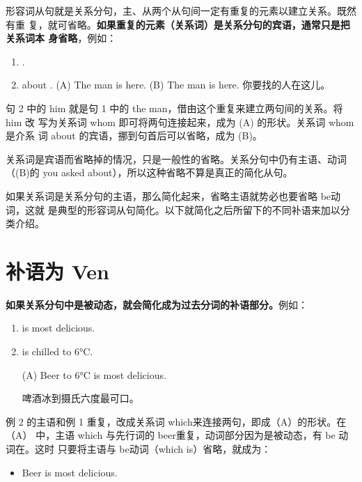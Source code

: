 形容词从句就是关系分句，主、从两个从句间一定有重复的元素以建立关系。既然有重
复，就可省略。\textbf{如果重复的元素（关系词）是关系分句的宾语，通常只是把关系词本
  身省略}，例如：

\begin{enumerate}
\item {}  .
\item {}  about .
\reitem (A) The man  is here.
\reitem (B) The man  is here.
你要找的人在这儿。
\end{enumerate}
句 2 中的 him 就是句 1 中的 the man，借由这个重复来建立两句间的关系。将him 改
写为关系词 whom 即可将两句连接起来，成为 (A) 的形状。关系词 whom是介系
词 about 的宾语，挪到句首后可以省略，成为 (B)。

关系词是宾语而省略掉的情况，只是一般性的省略。关系分句中仍有主语、动词
（(B)的 you asked about），所以这种省略不算是真正的简化从句。

如果关系词是关系分句的主语，那么简化起来，省略主语就势必也要省略 be动词，这就
是典型的形容词从句简化。以下就简化之后所留下的不同补语来加以分类介绍。

\section{补语为 Ven}

\textbf{如果关系分句中是被动态，就会简化成为过去分词的补语部分。}例如：
\begin{enumerate}
\item {} is most delicious.
\item {} is chilled to 6°C.

  \reitem (A) Beer  to 6°C is most delicious.

  啤酒冰到摄氏六度最可口。
\end{enumerate}
例 2 的主语和例 1 重复，改成关系词 which来连接两句，即成（A）的形状。在（A）
中，主语 which 与先行词的 beer重复，动词部分因为是被动态，有 be 动词在。这时
只要将主语与 be动词（which is）省略，就成为：
\begin{itemize}
\item Beer  is most delicious.
\end{itemize}

